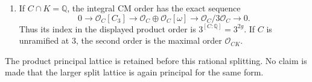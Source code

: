 \begin{theorem}
\begin{enumerate}
\[
 \operatorname{Hom}_{R_\ell}(T_\ell A,T_\ell B)
             \simeq R_\ell[C_3]                        \tag{G27.3}
\]
as integral Galois modules.  The right side has just that regular
finite-monodromy action.  This holds also at $\ell=3$.
\item If $C\cap K=\mathbb Q$, the integral CM order has the
exact sequence
\[
 0\longrightarrow\mathcal O_C[C_3]
  \longrightarrow\mathcal O_C\oplus\mathcal O_C[\omega]
  \longrightarrow\mathcal O_C/3\mathcal O_C
  \longrightarrow0.                                   \tag{G27.4}
\]
Thus its index in the displayed product order is
$3^{[C:\mathbb Q]}=3^{2g}$.
If $C$ is unramified at $3$, the second order is the maximal
order $\mathcal O_{CK}$.
\end{enumerate}
The product principal lattice is retained before this rational
splitting.  No claim is made that the larger split lattice is
again principal for the same form.
\end{theorem}
